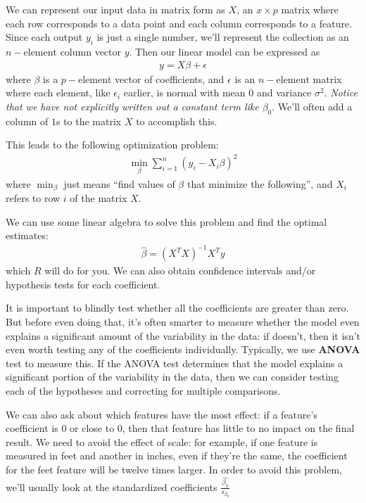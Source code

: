 \documentclass[a4paper]{article}
\numberwithin{equation}{section}
\begin{document}
We can represent our input data in matrix form as \(X\), an \(x \times p\) matrix where each row corresponds to a data point and each column corresponds to a feature. Since each output \(y_i\) is just a single number, we'll represent the collection as an \(n-\text{element}\) column vector \(y\).
Then our linear model can be expressed as
\begin{align*}
  y = X \beta + \epsilon
\end{align*}
where \(\beta \) is a \(p-\text{element}\) vector of coefficients, and \(\epsilon \) is an \(n-\text{element}\) matrix where each element, like \(\epsilon_i\) earlier, is normal with mean \(0\) and variance \(\sigma^2\).
\emph{Notice that we have not explicitly written out a constant term like \(\beta_0\)}. We'll often add a column of \(1\)s to the matrix \(X\) to accomplish this.

This leads to the following optimization problem:
\begin{align*}
  \min_{\beta} \sum_{i=1}^{n} {(y_i - X_i \beta)}^2
\end{align*}
where \(\min_{\beta}\) just means ``find values of \(\beta \) that minimize the following'', and \(X_i\) refers to row \(i\) of the matrix \(X\).

We can use some linear algebra to solve this problem and find the optimal estimates:
\begin{align*}
  \hat{\beta} = {(X^T X)}^{-1} X^T y
\end{align*}
which \(R\) will do for you. We can also obtain confidence intervals and/or hypothesis tests for each coefficient.

It is important to blindly test whether all the coefficients are greater than zero.
But before even doing that, it's often smarter to measure whether the model even explains a significant amount of the variability in the data: if doesn't, then it isn't even worth testing any of the coefficients individually.
Typically, we use \textbf{ANOVA} test to measure this.
If the ANOVA test determines that the model explains a significant portion of the variability in the data, then we can consider testing each of the hypotheses and correcting for multiple comparisons.

We can also ask about which features have the most effect: if a feature's coefficient is \(0\) or close to \(0\), then that feature has little to no impact on the final result.
We need to avoid the effect of scale: for example, if one feature is measured in feet and another in inches, even if they're the same, the coefficient for the feet feature will be twelve times larger.
In order to avoid this problem, we'll usually look at the standardized coefficients \(\frac{\hat{\beta_k}}{s_{\beta_{k}}}\)
\end{document}
